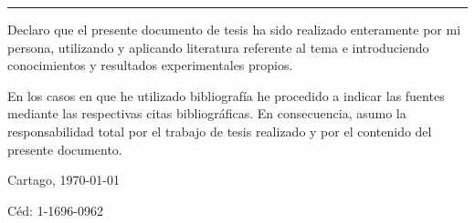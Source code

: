 \thispagestyle{empty}

\rule{10mm}{0pt}

\vfill

Declaro que el presente documento de tesis ha sido realizado enteramente
por mi persona, utilizando y aplicando literatura referente al tema e
introduciendo conocimientos y resultados experimentales propios.

En los casos en que he utilizado bibliografía he procedido a indicar las
fuentes mediante las respectivas citas bibliográficas.  En consecuencia,
asumo la responsabilidad total por el trabajo de tesis realizado y por
el contenido del presente documento.



\vspace*{8mm}

\begin{flushright}
  \thesisAuthor\par
  Cartago, \today\par
  Céd: 1-1696-0962
\end{flushright}

\cleardoublepage

